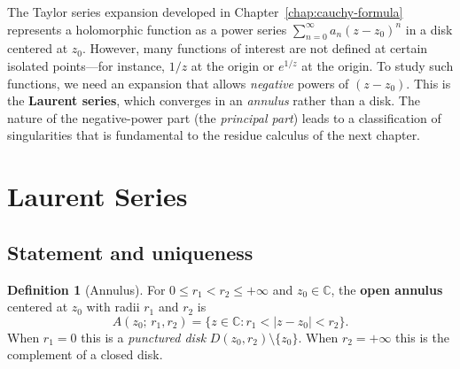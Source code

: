 \documentclass[12pt,a4paper,openany]{book}
\theoremstyle{definition}
\newtheorem{definition}{Definition}[chapter]
\theoremstyle{plain}
\theoremstyle{remark}
\newcommand{\C}{\mathbb{C}}
\newcommand{\abs}[1]{\left|#1\right|}
\begin{document}
The Taylor series expansion developed in Chapter~\ref{chap:cauchy-formula}
represents a holomorphic function as a power series $\sum_{n=0}^\infty a_n(z-z_0)^n$
in a disk centered at $z_0$. However, many functions of interest are not defined
at certain isolated points---for instance, $1/z$ at the origin or $e^{1/z}$ at
the origin. To study such functions, we need an expansion that allows
\emph{negative} powers of $(z-z_0)$. This is the \textbf{Laurent series}, which
converges in an \emph{annulus} rather than a disk. The nature of the negative-power
part (the \emph{principal part}) leads to a classification of singularities that
is fundamental to the residue calculus of the next chapter.

\section{Laurent Series}
\label{sec:laurent-series}

\subsection{Statement and uniqueness}

\begin{definition}[Annulus]\label{def:annulus}
For $0\le r_1 < r_2 \le +\infty$ and $z_0\in\C$, the \textbf{open annulus}
centered at $z_0$ with radii $r_1$ and $r_2$ is
\[
  A(z_0;\,r_1,r_2) = \{z\in\C : r_1 < \abs{z-z_0} < r_2\}.
\]
When $r_1=0$ this is a \emph{punctured disk} $D(z_0,r_2)\setminus\{z_0\}$.
When $r_2=+\infty$ this is the complement of a closed disk.
\end{definition}

\begin{center}
\end{center}
\end{document}
